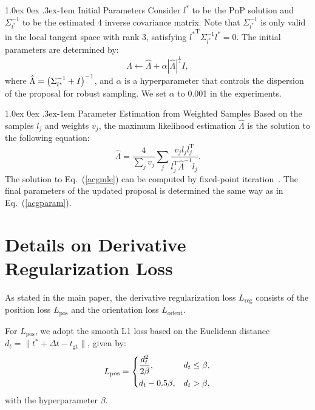 \documentclass[10pt,twocolumn,letterpaper]{article}
\makeatletter
\let\originalleft\left
\let\originalright\right
\renewcommand{\left}{\mathopen{}\mathclose\bgroup\originalleft}
\renewcommand{\right}{\aftergroup\egroup\originalright}
\renewcommand{\paragraph}{
  \@startsection{paragraph}{4}
  {\z@}{1.0ex \@plus 0ex \@minus .3ex}{-1em}
  {\normalfont\normalsize\bfseries}
}
\makeatother
\begin{document}
\paragraph{Initial Parameters}
Consider $l^\ast$ to be the PnP solution and $\Sigma_{l^\ast}^{-1}$ to be the estimated 4 inverse covariance matrix. Note that $\Sigma_{l^\ast}^{-1}$ is only valid in the local tangent space with rank 3, satisfying ${l^\ast}^\text{T} \Sigma_{l^\ast}^{-1} l^\ast = 0$. The initial parameters are determined by:
\begin{equation}
    \Lambda \gets \hat{\Lambda} + \alpha |\hat{\Lambda}|^{\frac{1}{4}}I,
    \label{acgparam}
\end{equation}
where $\hat{\Lambda} = \left(\Sigma_{l^\ast}^{-1} + I\right)^{-1}$, and $\alpha$ is a hyperparameter that controls the dispersion of the proposal for robust sampling. We set $\alpha$ to 0.001 in the experiments.

\paragraph{Parameter Estimation from Weighted Samples}
Based on the samples $l_j$ and weights $v_j$, the maximum likelihood estimation $\hat{\Lambda}$ is the solution to the following equation:
\begin{equation}
    \hat{\Lambda} = \frac{4}{\sum_j v_j} \sum_j \frac{v_j l_j l_j^\text{T}}{l_j^\text{T} \hat{\Lambda}^{-1} l_j}.
    \label{acgmle}
\end{equation}
The solution to Eq.~(\ref{acgmle}) can be computed by fixed-point iteration~\cite{ACG}. The final parameters of the updated proposal is determined the same way as in Eq.~(\ref{acgparam}).

\section{Details on Derivative Regularization Loss}

As stated in the main paper, the derivative regularization loss $L_\text{reg}$ consists of the position loss $L_\text{pos}$ and the orientation loss $L_\text{orient}$. 

For $L_\text{pos}$, we adopt the smooth L1 loss based on the Euclidean distance $d_t = \| t^\ast + \Delta t - t_\text{gt} \|$, given by:
\begin{equation}
    L_\text{pos} = 
    \begin{dcases}
    \frac{d_t^2}{2\beta}, & d_t \leq \beta,\\
    d_t - 0.5\beta, & d_t > \beta,
    \end{dcases}
\end{equation}
with the hyperparameter $\beta$.
\end{document}
